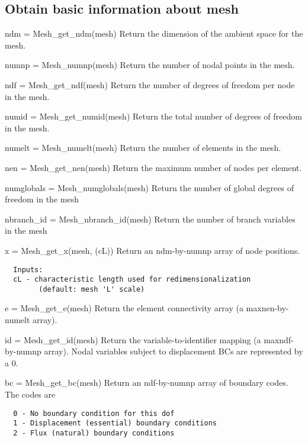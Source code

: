 \subsection{Obtain basic information about mesh}
\begin{codelist}

  \item[ndm = Mesh\_get\_ndm(mesh)]
  Return the dimension of the ambient space for the mesh.

  \item[numnp = Mesh\_numnp(mesh)]
  Return the number of nodal points in the mesh.

  \item[ndf = Mesh\_get\_ndf(mesh)]
  Return the number of degrees of freedom per node in the mesh.

  \item[numid = Mesh\_get\_numid(mesh)]
  Return the total number of degrees of freedom in the mesh.

  \item[numelt = Mesh\_numelt(mesh)]
  Return the number of elements in the mesh.

  \item[nen = Mesh\_get\_nen(mesh)]
  Return the maximum number of nodes per element.

  \item[numglobals = Mesh\_numglobals(mesh)]
  Return the number of global degrees of freedom in the mesh

  \item[nbranch\_id = Mesh\_nbranch\_id(mesh)]
  Return the number of branch variables in the mesh

  \item[x = Mesh\_get\_x(mesh, (cL))]
  Return an ndm-by-numnp array of node positions.
\begin{verbatim}
  Inputs:
  cL - characteristic length used for redimensionalization
        (default: mesh 'L' scale)
\end{verbatim}

  \item[e = Mesh\_get\_e(mesh)]
  Return the element connectivity array (a maxnen-by-numelt array).

  \item[id = Mesh\_get\_id(mesh)]
  Return the variable-to-identifier mapping (a maxndf-by-numnp array).
  Nodal variables subject to displacement BCs are represented by a 0.

  \item[bc = Mesh\_get\_bc(mesh)]
  Return an ndf-by-numnp array of boundary codes.  The codes are
\begin{verbatim}
  0 - No boundary condition for this dof
  1 - Displacement (essential) boundary conditions
  2 - Flux (natural) boundary conditions
\end{verbatim}


\end{codelist}
